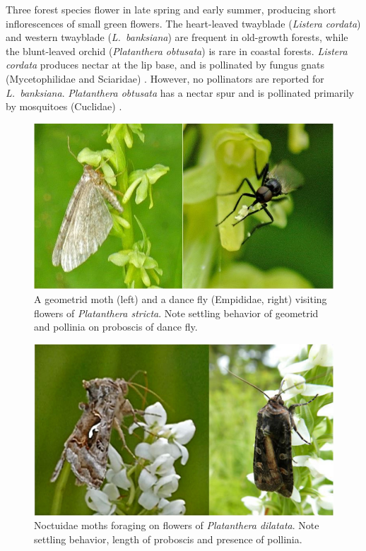 \begin{multicols}{2}
Three forest species flower in late spring and early summer, producing
short inflorescences of small green flowers. The heart-leaved twayblade
(\emph{Listera cordata}) and western twayblade (\emph{L.\ banksiana}) are
frequent in old-growth forests, while the blunt-leaved orchid
(\emph{Platanthera obtusata}) is rare in coastal forests. \emph{Listera
cordata} produces nectar at the lip base, and is pollinated by fungus
gnats (Mycetophilidae and Sciaridae) \citep{AckermanMesler1979}.
However, no pollinators are reported for \emph{L.\ banksiana}. \emph{Platanthera
obtusata} has a nectar spur and is pollinated primarily by mosquitoes
(Cuclidae) \citep{Gorham1976}.

\begin{figure}[H]
\begin{center}
\vspace{2mm}
\includegraphics[width=\textwidth]{img/moth_empidid.jpg}
\caption{A geometrid moth (left) and a dance fly (Empididae, right) visiting flowers of \emph{Platanthera stricta}.  Note settling behavior of geometrid and pollinia on proboscis of dance fly.}
\label{moth_empidid}
\end{center}
\end{figure}

\begin{figure}[H]
\begin{center}
\vspace{2mm}
\includegraphics[width=\textwidth]{img/Platanthera_dilatata_Noctuidae.jpg}
\caption{Noctuidae moths foraging on flowers of \emph{Platanthera dilatata}. Note settling behavior, length of proboscis and presence of pollinia.}
\label{Platanthera_dilatata_Noctuidae}
\end{center}
\end{figure}


\end{multicols}
